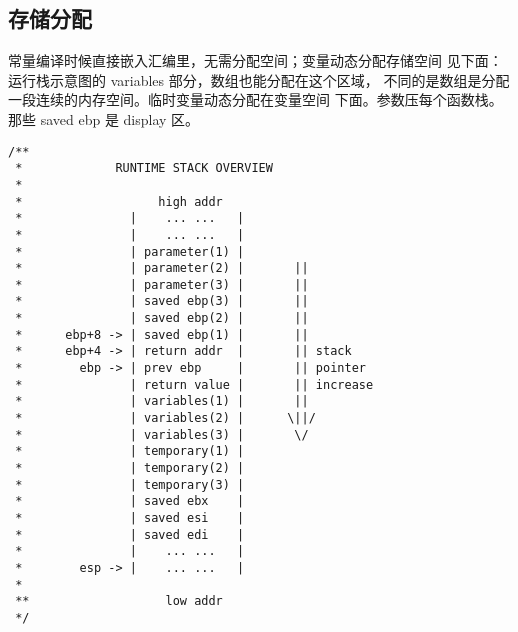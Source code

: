 \subsection{存储分配}
常量编译时候直接嵌入汇编里，无需分配空间；变量动态分配存储空间
见下面：运行栈示意图的 variables 部分，数组也能分配在这个区域，
不同的是数组是分配一段连续的内存空间。临时变量动态分配在变量空间
下面。参数压每个函数栈。那些 saved ebp 是 display 区。
\begin{verbatim}
/**
 *             RUNTIME STACK OVERVIEW
 *
 *                   high addr
 *               |    ... ...   |
 *               |    ... ...   |
 *               | parameter(1) |
 *               | parameter(2) |       ||
 *               | parameter(3) |       ||
 *               | saved ebp(3) |       ||
 *               | saved ebp(2) |       ||
 *      ebp+8 -> | saved ebp(1) |       ||
 *      ebp+4 -> | return addr  |       || stack
 *        ebp -> | prev ebp     |       || pointer
 *               | return value |       || increase
 *               | variables(1) |       ||
 *               | variables(2) |      \||/
 *               | variables(3) |       \/
 *               | temporary(1) |
 *               | temporary(2) |
 *               | temporary(3) |
 *               | saved ebx    |
 *               | saved esi    |
 *               | saved edi    |
 *               |    ... ...   |
 *        esp -> |    ... ...   |
 *
 **                   low addr
 */
\end{verbatim}
